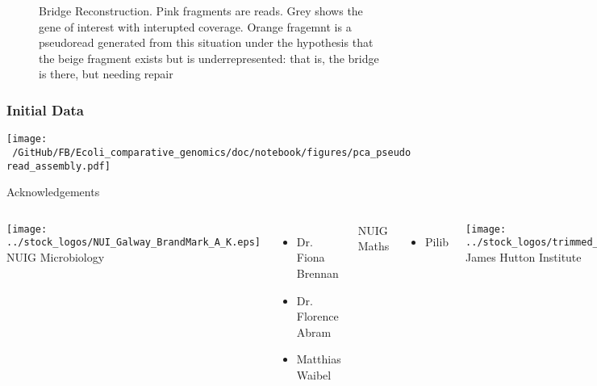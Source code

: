 \documentclass[10pt, compress]{beamer}
\begin{document}
\begin{frame}[fragile]
\begin{figure}
\begin{tikzpicture}[y=0.80pt, x=0.80pt, yscale=-1.00000, xscale=1.000000, inner sep=0pt, outer sep=0pt]
\end{tikzpicture}

\caption{Bridge Reconstruction. Pink fragments are reads.  Grey shows the gene of interest with interupted coverage. Orange fragemnt is a pseudoread generated from this situation under the hypothesis that the beige fragment exists but is underrepresented: that is, the bridge is there, but needing repair}
\label{fig:bridge_rec}
\end{figure}
\end{frame}

\begin{frame}[fragile]
  \frametitle{Initial Data}
  \texttt{[image: ~/GitHub/FB/Ecoli\_comparative\_genomics/doc/notebook/figures/pca\_pseudoread\_assembly.pdf]}
\end{frame}


\begin{frame}
%

\end{frame}
\begin{frame}
%

\end{frame}
\begin{frame}
%

\end{frame}

\begin{frame}{Acknowledgements}
  \begin{columns}[onlytextwidth]
    \texttt{[image: ../stock\_logos/NUI\_Galway\_BrandMark\_A\_K.eps]}\\
     NUIG Microbiology
      \begin{itemize}
        \item Dr. Fiona Brennan
        \item Dr. Florence Abram 
        \item Matthias Waibel
      \end{itemize}
      NUIG Maths
      \begin{itemize}
        \item Pilib 
      \end{itemize}

    \texttt{[image: ../stock\_logos/trimmed\_jhi.png]}\\
      James Hutton Institute
      \begin{itemize}
        \item Leighton Pritchard
      \end{itemize}
  \end{columns}
\end{frame}



\end{document}
